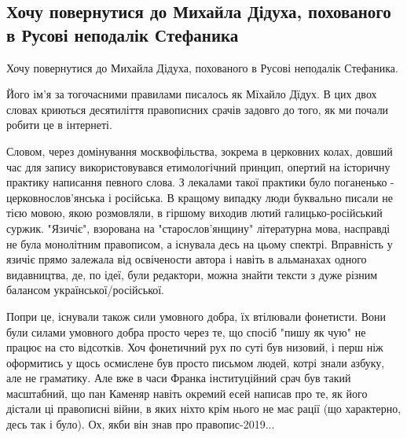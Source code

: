  
 
 
 
 

\subsection{Хочу повернутися до Михайла Дідуха, похованого в Русові неподалік Стефаника}
\label{sec:17_05_2021.fb.ukrainec_ostap.1.mova}

Хочу повернутися до Михайла Дідуха, похованого в Русові неподалік Стефаника.

Його ім'я за тогочасними правилами писалось як Мїхайло Дїдух. В цих двох словах
криються десятиліття правописних срачів задовго до того, як ми почали робити це
в інтернеті.

Словом, через домінування москвофільства, зокрема в церковних колах, довший час
для запису використовувався етимологічний принцип, опертий на історичну
практику написання певного слова. З лекалами такої практики було поганенько -
церковнослов'янська і російська. В кращому випадку люди буквально писали не
тією мовою, якою розмовляли, в гіршому виходив лютий галицько-російський
суржик. "Язичіє", взорована на "старослов'янщину" літературна мова, насправді
не була монолітним правописом, а існувала десь на цьому спектрі. Вправність у
язичіє прямо залежала від освічености автора і навіть в альманахах одного
видавництва, де, по ідеї, були редактори, можна знайти тексти з дуже різним
балансом української/російської. 

Попри це, існували також сили умовного добра, їх втілювали фонетисти. Вони були
силами умовного добра просто через те, що спосіб "пишу як чую" не працює на сто
відсотків. Хоч фонетичний рух по суті був низовий, і перш ніж оформитись у щось
осмислене був просто письмом людей, котрі знали азбуку, але не граматику. Але
вже в часи Франка інституційний срач був такий масштабний, що пан Каменяр
навіть окремий есей написав про те, як його дістали ці правописні війни, в яких
ніхто крім нього не має рації (що характерно, десь так і було). Ох, якби він
знав про правопис-2019...

